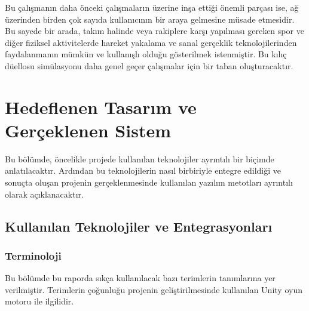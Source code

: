 \documentclass[a4paper, 12pt, titlepage]{article}
\begin{document}
Bu çalışmanın daha önceki çalışmaların üzerine inşa ettiği önemli parçası ise, ağ üzerinden birden
çok sayıda kullanıcının bir araya gelmesine müsade etmesidir. Bu sayede bir arada, takım halinde
veya rakiplere karşı yapılması gereken spor ve diğer fiziksel aktivitelerde hareket yakalama ve
sanal gerçeklik teknolojilerinden faydalanmanın mümkün ve kullanışlı olduğu gösterilmek istenmiştir.
Bu kılıç düellosu simülasyonu daha genel geçer çalışmalar için bir taban oluşturacaktır.

\newpage

\section{Hedeflenen Tasarım ve Gerçeklenen Sistem}
Bu bölümde, öncelikle projede kullanılan teknolojiler ayrıntılı bir biçimde anlatılacaktır.
Ardından bu teknolojilerin nasıl birbiriyle entegre edildiği ve sonuçta oluşan projenin
gerçeklenmesinde kullanılan yazılım metotları ayrıntılı olarak açıklanacaktır.
\subsection{Kullanılan Teknolojiler ve Entegrasyonları}
\subsubsection{Terminoloji}

Bu bölümde bu raporda sıkça kullanılacak bazı terimlerin tanımlarına yer verilmiştir. Terimlerin
çoğunluğu projenin geliştirilmesinde kullanılan Unity oyun motoru ile ilgilidir.
\end{document}
